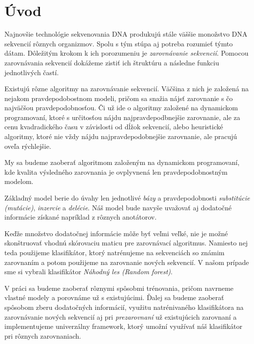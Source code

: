 {}
\chapter*{Úvod}


Najnovšie technológie sekvenovania DNA produkujú stále väššie monožstvo DNA sekvencií rôznych organizmov. Spolu s tým stúpa aj potreba rozumieť týmto dátam. 
Dôležitým krokom k ich porozumeniu je \textit{zarovnávanie sekvencií}. Pomocou zarovnávania sekvencií dokážeme zistiť ich štruktúru a následne funkciu jednotlivých častí.

Existujú rôzne algoritmy na zarovnávanie sekvencií. Väčšina z nich je založená na nejakom pravdepodobostnom modeli, pričom sa snažia nájsť zarovnanie s čo najväčšou pravdepodobnosťou. Či už ide o algoritmy založené na dynamickom programovaní, ktoré s určitosťou nájdu najpravdepodbnejšie zarovnanie, ale za cenu kvadradického času v závislosti od dĺžok sekvencií, alebo heuristické algoritmy, ktoré nie vždy nájdu najpravdepodobnejšie zarovnanie, ale pracujú oveľa rýchlejšie.

My sa budeme zaoberať algoritmom založeným na dynamickom programovaní, kde kvalita výsledného zarovnania je ovplyvnená len pravdepodobnostným modelom.

Základný model berie do úvahy len jednotlivé \textit{bázy} a pravdepodobnosti \textit{substitúcie (mutácie)}, \textit{inzercie} a \textit{delécie}.
Náš model bude navyše uvažovať aj dodatočné informácie získané napríklad z rôznych anotátorov.

Keďže množstvo dodatočnej informácie môže byť veľmi veľké, %
nie je možné skonštruovať vhodnú skórovaciu maticu pre zarovnávací algoritmus.
Namiesto nej teda použijeme klasifikátor, ktorý natrénujeme na sekvenciách so známim zarovnaním a potom použijeme na zarovnanie nových sekvencií. V našom prípade sme si vybrali klasifikátor \textit{Náhodný les (Random forest)}.

V práci sa budeme zaoberať rôznymi spôsobmi trénovania, pričom navrneme vlastné modely a porovnáme už s existujúcimi. Ďalej sa budeme zaoberať spôsobom zberu dodatočných informácií, využitu natrénivaného klasifikátora na zarovnávanie nových sekvencií aj pri \textit{prezarovnaní} už existujúcich zarovnaní a implementujeme univerzálny framework, ktorý umožní využívať náš klasifikátor pri rôznych zarovnaniach.

